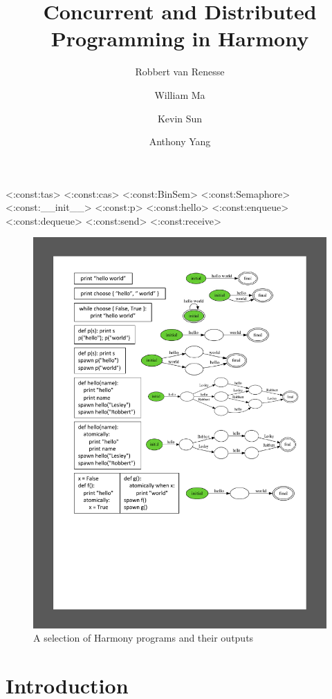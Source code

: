 \documentclass[twocolumn]{article}
\title{Concurrent and Distributed Programming in Harmony}
\author{Robbert van Renesse \and William Ma \and Kevin Sun \and Anthony Yang}
\begin{document}
\maketitle

<{:const:tas}>
<{:const:cas}>
<{:const:BinSem}>
<{:const:Semaphore}>
<{:const:__init__}>
<{:const:p}>
<{:const:hello}>
<{:const:enqueue}>
<{:const:dequeue}>
<{:const:send}>
<{:const:receive}>

\begin{figure}
\begin{center}
\includegraphics[width=.9\textwidth]{hello.pdf}
\end{center}
\caption{A selection of Harmony programs and their outputs}
\label{fig:helloworld}
\end{figure}

\section{Introduction}
\end{document}
